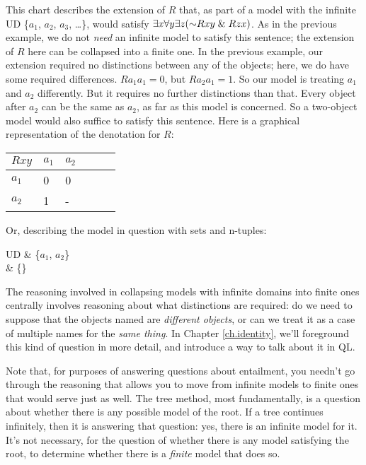 This chart describes the extension of $R$ that, as part of a model with the infinite UD \{$a_{1}$, $a_{2}$, $a_{3}$, \ldots\}, would satisfy $\qt{\exists}{x} \qt{\forall}{y} \qt{\exists}{z} (\enot Rxy \eand Rzx)$. As in the previous example, we do not \emph{need} an infinite model to satisfy this sentence; the extension of $R$ here can be collapsed into a finite one. In the previous example, our extension required no distinctions between any of the objects; here, we do have some required differences. $Ra_{1}a_{1}=0$, but $Ra_{2}a_{1}=1$. So our model is treating $a_{1}$ and $a_{2}$ differently. But it requires no further distinctions than that. Every object after $a_{2}$ can be the same as $a_{2}$, as far as this model is concerned.  So a two-object model would also suffice to satisfy this sentence. Here is a graphical representation of the denotation for $R$:

\begin{table}[h!]
\centering
\begin{tabular}{l|lllll}
$Rxy$   & $a_{1}$ & $a_{2}$ \\ \hline
$a_{1}$   & 0 & 0   \\
$a_{2}$   & 1 & - \\
\end{tabular}
\end{table}

Or, describing the model in question with sets and n-tuples:


\begin{partialmodel}
	UD & \{$a_{1}$, $a_{2}$\}\\
	 & \{\}
\end{partialmodel}


The reasoning involved in collapsing models with infinite domains into finite ones centrally involves reasoning about what distinctions are required: do we need to suppose that the objects named are \emph{different objects}, or can we treat it as a case of multiple names for the \emph{same thing}. In Chapter \ref{ch.identity}, we'll foreground this kind of question in more detail, and introduce a way to talk about it in QL.

Note that, for purposes of answering questions about entailment, you needn't go through the reasoning that allows you to move from infinite models to finite ones that would serve just as well. The tree method, most fundamentally, is a question about whether there is any possible model of the root. If a tree continues infinitely, then it is answering that question: yes, there is an infinite model for it. It's not necessary, for the question of whether there is any model satisfying the root, to determine whether there is a \emph{finite} model that does so.

